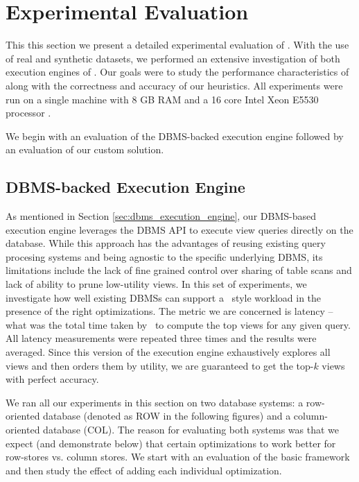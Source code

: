 \section{Experimental Evaluation}
\label{sec:experiments}

This this section we present a detailed experimental evaluation of \VizRecDB.
With the use of real and synthetic datasets, we performed an extensive
investigation of both execution engines of \VizRecDB. 
Our goals were to study the performance characteristics of \VizRecDB along with
the correctness and accuracy of our heuristics.
All experiments were run on a
single machine with 8 GB RAM and a 16 core Intel Xeon E5530 processor .

We begin with an evaluation of the DBMS-backed execution engine followed by an
evaluation of our custom solution.

\subsection{DBMS-backed Execution Engine}
\label{sec:expts_dbms_execution_engine}

As mentioned in Section \ref{sec:dbms_execution_engine}, our DBMS-based
execution engine leverages the DBMS API to execute view queries directly on the
database.
While this approach has the advantages of reusing existing query procesing
systems and being agnostic to the specific underlying DBMS, its limitations
include the lack of fine grained control over sharing of table scans and lack of
ability to prune low-utility views. 
In this set of experiments, we investigate how well existing DBMSs can support a
\VizRecDB\ style workload in the presence of the right optimizations.
The metric we are concerned is latency -- what was the total time taken by
\VizRecDB\ to compute the top views for any given query.
All latency measurements were repeated three times and the results were
averaged.
Since this version of the execution engine exhaustively explores all views and
then orders them by utility, we are guaranteed to get the top-$k$ views with
perfect accuracy.

We ran all our experiments in this section on two database systems: a
row-oriented database (denoted as ROW in the following figures) and a
column-oriented database (COL).
The reason for evaluating both systems was that we expect (and
demonstrate below) that certain optimizations to work better for row-stores vs.
column stores.
We start with an evaluation of the basic framework and then study the effect of
adding each individual optimization.\\

